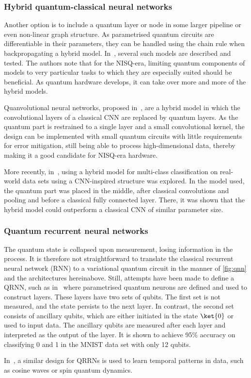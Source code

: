 \subsubsection{Hybrid quantum-classical neural networks}
Another option is to include a quantum layer or node in some larger pipeline or even non-linear graph structure.
As parametrised quantum circuits are differentiable in their parameters, they can be handled using the chain rule when backpropagating a hybrid model.
In~\autocite{killoran2019}, several such models are described and tested.
The authors note that for the NISQ-era, limiting quantum components of models to very particular tasks to which they are especially suited should be beneficial.
As quantum hardware develops, it can take over more and more of the hybrid models.

Quanvolutional neural networks, proposed in~\autocite{henderson2020}, are a hybrid model in which the convolutional layers of a classical CNN are replaced by quantum layers.
As the quantum part is restrained to a single layer and a small convolutional kernel, the design can be implemented with small quantum circuits with little requirements for error mitigation, still being able to process high-dimensional data, thereby making it a good candidate for NISQ-era hardware.

More recently, in~\autocite{zeng2022}, using a hybrid model for multi-class classification on real-world data sets using a CNN-inspired structure was explored.
In the model used, the quantum part was placed in the middle, after classical convolutions and pooling and before a classical fully connected layer.
There, it was shown that the hybrid model could outperform a classical CNN of similar parameter size.

\subsubsection{Quantum recurrent neural networks}
The quantum state is collapsed upon measurement, losing information in the process.
It is therefore not straightforward to translate the classical recurrent neural network (RNN) to a variational quantum circuit in the manner of \cref{fig:qnn} and the architectures hereinabove.
Still, attempts have been made to define a QRNN, such as in~\autocite{bausch2020} where parametrised quantum neurons are defined and used to construct layers.
These layers have two sets of qubits.
The first set is not measured, and the state persists to the next layer.
In contrast, the second set consists of ancillary qubits, which are either initiated in the state $\ket{0}$ or used to input data.
The ancillary qubits are measured after each layer and interpreted as the output of the layer.
It is shown to achieve 95\% accuracy on classifying 0 and 1 in the MNIST data set with only 12 qubits.

In~\autocite{takaki2021}, a similar design for QRRNs is used to learn temporal patterns in data, such as cosine waves or spin quantum dynamics.